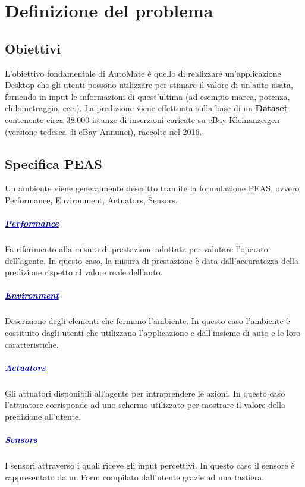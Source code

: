 \chapter{Definizione del problema}
\section{Obiettivi}
L'obiettivo fondamentale di AutoMate è quello di realizzare un'applicazione Desktop che gli utenti possono utilizzare per stimare il valore di un'auto usata, fornendo in input le informazioni di quest'ultima (ad esempio marca, potenza, chilometraggio, ecc.). La predizione viene effettuata sulla base di un \textbf{Dataset} contenente circa 38.000 istanze di inserzioni caricate su eBay Kleinanzeigen (versione tedesca di eBay Annunci), raccolte nel 2016.
\medskip
\section{Specifica PEAS}
Un ambiente viene generalmente descritto tramite la formulazione PEAS, ovvero 
Performance, Environment, Actuators, Sensors.
\paragraph{\textcolor[HTML]{000099}{\underline{Performance}}} Fa riferimento alla misura di prestazione adottata per valutare l'operato dell'agente. In questo caso, la misura di prestazione è data dall'accuratezza della predizione rispetto al valore reale dell'auto.
\paragraph{\textcolor[HTML]{000099}{\underline{Environment}}} Descrizione degli elementi che formano l'ambiente. In questo caso l'ambiente è costituito dagli utenti che utilizzano l'applicazione e dall'insieme di auto e le loro caratteristiche.
\paragraph{\textcolor[HTML]{000099}{\underline{Actuators}}} Gli attuatori disponibili all'agente per intraprendere le azioni. In questo caso l'attuatore corrisponde ad uno schermo utilizzato per mostrare il valore della predizione all'utente.

\paragraph{\textcolor[HTML]{000099}{\underline{Sensors}}} I sensori attraverso i quali riceve gli input percettivi. In questo caso il sensore è rappresentato da un Form compilato dall'utente grazie ad una tastiera.
